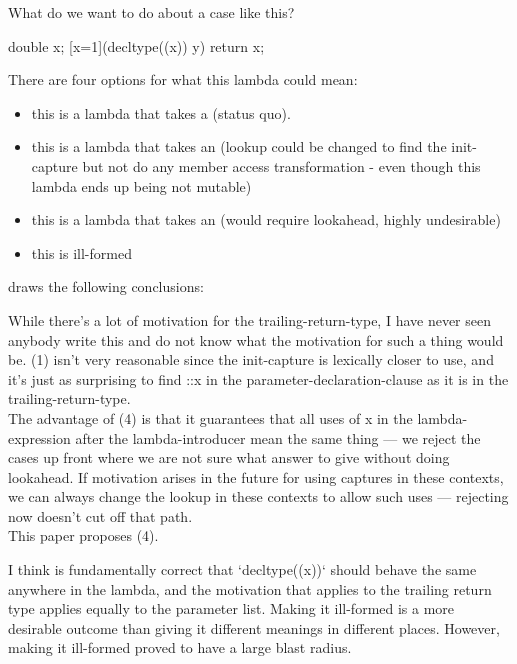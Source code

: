 \documentclass{wg21}
\begin{document}
\begin{quoteblock}
What do we want to do about a case like this?

\begin{colorblock}
double x;
[x=1](decltype((x)) y){ return x; }
\end{colorblock}

There are four options for what this lambda could mean:

\begin{itemize}
\item this is a lambda that takes a  (status quo).
\item this is a lambda that takes an  (lookup could be changed to find the init-capture but not do any member access transformation - even though this lambda ends up being not mutable)
\item this is a lambda that takes an  (would require lookahead, highly undesirable)
\item this is ill-formed
\end{itemize}

\end{quoteblock}

 draws the following conclusions:

\begin{quoteblock}

While there's a lot of motivation for the trailing-return-type, I have never seen anybody write this and do not know what the motivation for such a thing would be. (1) isn't very reasonable since the init-capture is lexically closer to use, and it's just as surprising to find ::x in the parameter-declaration-clause as it is in the trailing-return-type.\\

The advantage of (4) is that it guarantees that all uses of x in the lambda-expression after the lambda-introducer mean the same thing — we reject the cases up front where we are not sure what answer to give without doing lookahead. If motivation arises in the future for using captures in these contexts, we can always change the lookup in these contexts to allow such uses — rejecting now doesn't cut off that path.\\

This paper proposes (4).

\end{quoteblock}

I think  is fundamentally correct that `decltype((x))` should behave the same anywhere in the lambda, and the motivation that applies to
the trailing return type applies equally to the parameter list. Making it ill-formed is a more desirable outcome than giving it different meanings in different places.
However, making it ill-formed proved to have a large blast radius.
\end{document}
